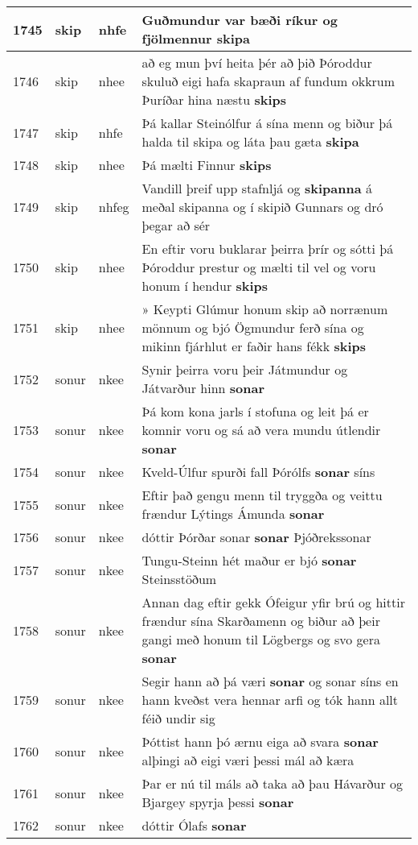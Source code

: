 \documentclass{article}
\begin{document}
\begin{longtable}{p{1cm}|p{1cm}|p{1cm}|p{13cm}}
\hline
1745&skip&nhfe&Guðmundur var bæði ríkur og fjölmennur \textbf{skipa} \\
\hline
1746&skip&nhee&að eg mun því heita þér að þið Þóroddur skuluð eigi hafa skapraun af fundum okkrum Þuríðar hina næstu \textbf{skips} \\
\hline
1747&skip&nhfe&Þá kallar Steinólfur á sína menn og biður þá halda til skipa og láta þau gæta \textbf{skipa} \\
\hline
1748&skip&nhee&Þá mælti Finnur \textbf{skips} \\
\hline
1749&skip&nhfeg&Vandill þreif upp stafnljá og \textbf{skipanna} á meðal skipanna og í skipið Gunnars og dró þegar að sér\\
\hline
1750&skip&nhee&En eftir voru buklarar þeirra þrír og sótti þá Þóroddur prestur og mælti til vel og voru honum í hendur \textbf{skips} \\
\hline
1751&skip&nhee&» Keypti Glúmur honum skip að norrænum mönnum og bjó Ögmundur ferð sína og mikinn fjárhlut er faðir hans fékk \textbf{skips} \\
\hline
1752&sonur&nkee&Synir þeirra voru þeir Játmundur og Játvarður hinn \textbf{sonar} \\
\hline
1753&sonur&nkee&Þá kom kona jarls í stofuna og leit þá er komnir voru og sá að vera mundu útlendir \textbf{sonar} \\
\hline
1754&sonur&nkee&Kveld-Úlfur spurði fall Þórólfs \textbf{sonar} síns\\
\hline
1755&sonur&nkee&Eftir það gengu menn til tryggða og veittu frændur Lýtings Ámunda \textbf{sonar} \\
\hline
1756&sonur&nkee&dóttir Þórðar sonar \textbf{sonar} Þjóðrekssonar\\
\hline
1757&sonur&nkee&Tungu-Steinn hét maður er bjó \textbf{sonar} Steinsstöðum\\
\hline
1758&sonur&nkee&Annan dag eftir gekk Ófeigur yfir brú og hittir frændur sína Skarðamenn og biður að þeir gangi með honum til Lögbergs og svo gera \textbf{sonar} \\
\hline
1759&sonur&nkee&Segir hann að þá væri \textbf{sonar} og sonar síns en hann kveðst vera hennar arfi og tók hann allt féið undir sig\\
\hline
1760&sonur&nkee&Þóttist hann þó ærnu eiga að svara \textbf{sonar} alþingi að eigi væri þessi mál að kæra\\
\hline
1761&sonur&nkee&Þar er nú til máls að taka að þau Hávarður og Bjargey spyrja þessi \textbf{sonar} \\
\hline
1762&sonur&nkee&dóttir Ólafs \textbf{sonar} \\

\end{longtable}
\end{document}
